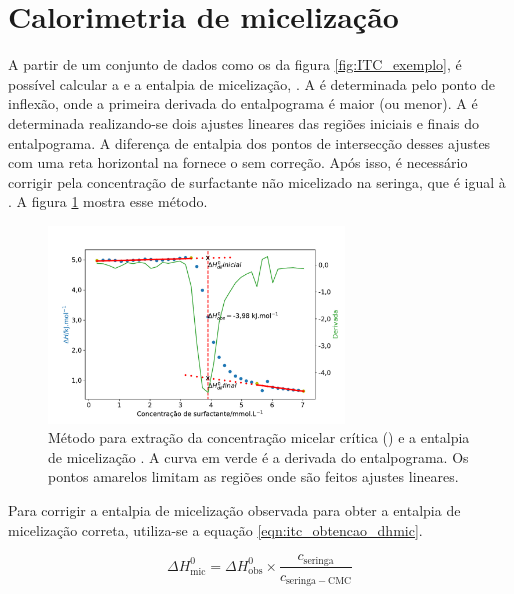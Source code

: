 		\section{Calorimetria de micelização} 
		\label{sec:calorimetria_micelizacao}
		A partir de um conjunto de dados como os da figura \ref{fig:ITC_exemplo}, é possível calcular a \cmc{} e a entalpia de micelização, \DHmic. A \cmc{} é determinada pelo ponto de inflexão, onde a primeira derivada do entalpograma é maior (ou menor). A \DHmic{} é determinada realizando-se dois ajustes lineares das regiões iniciais e finais do entalpograma. A diferença de entalpia dos pontos de intersecção desses ajustes com uma reta horizontal na \cmc{} fornece o \DHmic{} sem correção. Após isso, é necessário corrigir pela concentração de surfactante não micelizado na seringa, que é igual à \cmc{}. A figura \ref{fig:itc_extracao_cmc_dh} mostra esse método.
		
		\begin{figure}[h] 
			\centering
			\includegraphics[width=0.7\textwidth]{imagens/itc/extracao_cmc_dh_exemplo}
			\caption{Método para extração da concentração micelar crítica (\cmc) e a entalpia de micelização \DHmic. A curva em verde é a derivada do entalpograma. Os pontos amarelos limitam as regiões onde são feitos ajustes lineares.}
			\label{fig:itc_extracao_cmc_dh}
		\end{figure}  %

		Para corrigir a entalpia de micelização observada para obter a entalpia de micelização correta, utiliza-se a equação \ref{eqn:itc_obtencao_dhmic}.  
		
		\begin{equation}
			\Delta H^0_{\textrm{mic}} = \Delta H^0_{\textrm{obs}} \times \dfrac{c_{\textrm{seringa}}}{c_{\textrm{seringa}-\mathrm{CMC}}}
			\label{eqn:itc_obtencao_dhmic}
		\end{equation}  %
		
